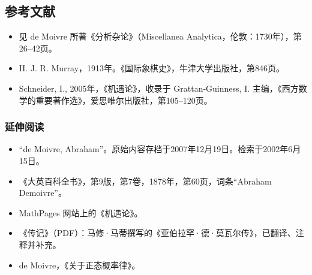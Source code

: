 \subsection{参考文献}
\begin{itemize}
\item 见 de Moivre 所著《分析杂论》（Miscellanea Analytica，伦敦：1730年），第26–42页。
\item H. J. R. Murray，1913年。《国际象棋史》，牛津大学出版社，第846页。
\item Schneider, I., 2005年，《机遇论》，收录于 Grattan-Guinness, I. 主编，《西方数学的重要著作选》，爱思唯尔出版社，第105–120页。
\end{itemize}
\subsubsection{延伸阅读}
\begin{itemize}
\item “de Moivre, Abraham”。原始内容存档于2007年12月19日。检索于2002年6月15日。
\item 《大英百科全书》，第9版，第7卷，1878年，第60页，词条“Abraham Demoivre”。
\item MathPages 网站上的《机遇论》。
\item 《传记》（PDF）：马修·马蒂撰写的《亚伯拉罕·德·莫瓦尔传》，已翻译、注释并补充。
\item de Moivre，《关于正态概率律》。
\end{itemize}
